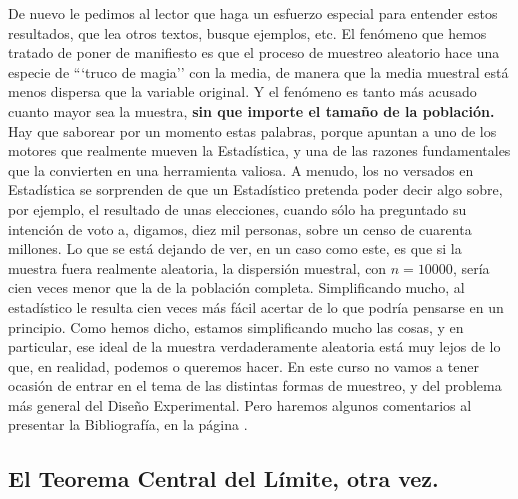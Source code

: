 De nuevo le pedimos al lector que haga un esfuerzo especial para entender estos
resultados, que lea otros textos, busque ejemplos, etc. El fenómeno que hemos
tratado de poner de manifiesto es que el proceso de muestreo aleatorio hace
una especie de ```truco de magia'' con la media, de manera que la media muestral está
menos dispersa que la variable original. Y el fenómeno es tanto más acusado
cuanto mayor sea la muestra, {\bf sin que importe el tamaño de la población.}
Hay que saborear por un momento estas palabras, porque apuntan a uno de los
motores que realmente mueven la Estadística, y una de las razones fundamentales
que la convierten en una herramienta valiosa. A menudo, los no versados en
Estadística se sorprenden de que un Estadístico pretenda poder decir algo
sobre, por ejemplo, el resultado de unas elecciones, cuando sólo ha preguntado
su intención de voto a, digamos, diez mil personas, sobre un censo de cuarenta
millones. Lo que se está dejando de ver, en un caso como este, es que si la
muestra fuera realmente aleatoria, la dispersión muestral, con $n=10000$, sería
cien veces menor que la de la población completa. Simplificando mucho, al
estadístico le resulta cien veces más fácil acertar de lo que podría pensarse
en un principio. Como hemos dicho, estamos simplificando mucho las cosas, y en
particular, ese ideal de la muestra verdaderamente aleatoria está muy lejos de
lo que, en realidad, podemos o queremos hacer. En este curso no vamos a tener
ocasión de entrar en el tema de las distintas formas de muestreo, y del
problema más general del Diseño Experimental. Pero haremos algunos comentarios
al presentar la Bibliografía, en la página
\pageref{apendice:comentarioBibliografia}.


\subsection{El Teorema Central del Límite, otra vez.}
\label{cap06:subsec:teoremaCentralLimiteSegundaVersion}

